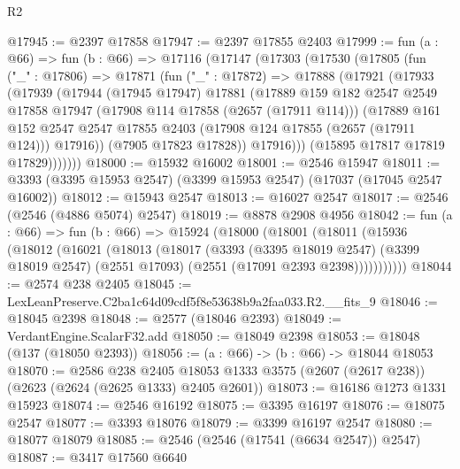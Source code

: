 \begin{lexlean}{R2}
\begin{coremodule}
@17945 := @2397 @17858
@17947 := @2397 @17855 @2403
@17999 := fun (a : @66) =>
  fun (b : @66) =>
  @17116
    (@17147
      (@17303
        (@17530
          (@17805
            (fun ("_" : @17806) =>
            @17871
              (fun ("_" : @17872) =>
              @17888
                (@17921
                  (@17933
                    (@17939
                      (@17944
                        (@17945 @17947)
                        @17881
                        (@17889
                          @159
                          @182
                          @2547
                          @2549
                          @17858
                          @17947
                          (@17908 @114 @17858 (@2657 (@17911 @114)))
                          (@17889
                            @161
                            @152
                            @2547
                            @2547
                            @17855
                            @2403
                            (@17908 @124 @17855 (@2657 (@17911 @124)))
                            @17916))
                        (@7905 @17823 @17828))
                      @17916)))
                (@15895 @17817 @17819 @17829)))))))
@18000 := @15932 @16002
@18001 := @2546 @15947
@18011 := @3393 (@3395 @15953 @2547) (@3399 @15953 @2547) (@17037 (@17045 @2547 @16002))
@18012 := @15943 @2547
@18013 := @16027 @2547
@18017 := @2546 (@2546 (@4886 @5074) @2547)
@18019 := @8878 @2908 @4956
@18042 := fun (a : @66) =>
  fun (b : @66) =>
  @15924
    (@18000
      (@18001
        (@18011
          (@15936
            (@18012
              (@16021
                (@18013
                  (@18017
                    (@3393
                      (@3395 @18019 @2547)
                      (@3399 @18019 @2547)
                      (@2551 @17093)
                      (@2551 (@17091 @2393 @2398)))))))))))
@18044 := @2574 @238 @2405
@18045 := LexLeanPreserve.C2ba1c64d09cdf5f8e53638b9a2faa033.R2.__fits_9
@18046 := @18045 @2398
@18048 := @2577 (@18046 @2393)
@18049 := VerdantEngine.ScalarF32.add
@18050 := @18049 @2398
@18053 := @18048 (@137 (@18050 @2393))
@18056 := (a : @66) -> (b : @66) -> @18044 @18053
@18070 := @2586
    @238
    @2405
    @18053
    @1333
    @3575
    (@2607 (@2617 @238))
    (@2623 (@2624 (@2625 @1333) @2405 @2601))
@18073 := @16186 @1273 @1331 @15923
@18074 := @2546 @16192
@18075 := @3395 @16197
@18076 := @18075 @2547
@18077 := @3393 @18076
@18079 := @3399 @16197 @2547
@18080 := @18077 @18079
@18085 := @2546 (@2546 (@17541 (@6634 @2547)) @2547)
@18087 := @3417 @17560 @6640

\end{coremodule}
\end{lexlean}
